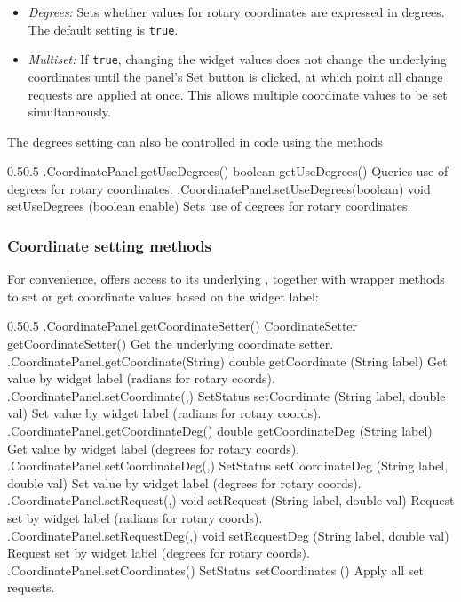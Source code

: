 \begin{itemize}

\item {\it Degrees:} Sets whether values for rotary coordinates
are expressed in degrees. The default setting is {\tt true}.

\item {\it Multiset:} If {\tt true}, changing the widget
values does not change the underlying coordinates until the panel's {\sf Set}
button is clicked, at which point all change requests are applied at once. This
allows multiple coordinate values to be set simultaneously.
		
\end{itemize}

The degrees setting can also be controlled in code using the methods
%
\begin{methodtable}{0.5}{0.5}
\midline
%
\methodentry
{\gui.CoordinatePanel.getUseDegrees()}%
{boolean getUseDegrees()}%
{Queries use of degrees for rotary coordinates.}%
%
\methodentry
{\gui.CoordinatePanel.setUseDegrees(boolean)}%
{void setUseDegrees (boolean enable)}%
{Sets use of degrees for rotary coordinates.}%
%
\midline
\end{methodtable}
%

\subsubsection{Coordinate setting methods}

For convenience,  offers access to its
underlying
, together with wrapper methods to
set or get coordinate values based on the widget label:

%
\begin{methodtable}{0.5}{0.5}
\midline
%
\methodentry
{\gui.CoordinatePanel.getCoordinateSetter()}%
{CoordinateSetter getCoordinateSetter()}%
{Get the underlying coordinate setter.}%
%
\methodspace{0.5em}%
%
\methodentry
{\gui.CoordinatePanel.getCoordinate(String)}%
{double getCoordinate (String label)}%
{Get value by widget label (radians for rotary coords).}%
%
\methodentry
{\gui.CoordinatePanel.setCoordinate(,)}%
{SetStatus setCoordinate (String label, double val)}%
{Set value by widget label (radians for rotary coords).}%
%
\methodentry
{\gui.CoordinatePanel.getCoordinateDeg()}%
{double getCoordinateDeg (String label)}%
{Get value by widget label (degrees for rotary coords).}%
%
\methodentry
{\gui.CoordinatePanel.setCoordinateDeg(,)}%
{SetStatus setCoordinateDeg (String label, double val)}%
{Set value by widget label (degrees for rotary coords).}%
%
\methodspace{0.5em}%
%
\methodentry
{\gui.CoordinatePanel.setRequest(,)}%
{void setRequest (String label, double val)}%
{Request set by widget label (radians for rotary coords).}%
%
\methodentry
{\gui.CoordinatePanel.setRequestDeg(,)}%
{void setRequestDeg (String label, double val)}%
{Request set by widget label (degrees for rotary coords).}%
%
\methodentry
{\gui.CoordinatePanel.setCoordinates()}%
{SetStatus setCoordinates ()}%
{Apply all set requests.}%
%
\midline
\end{methodtable}
%

